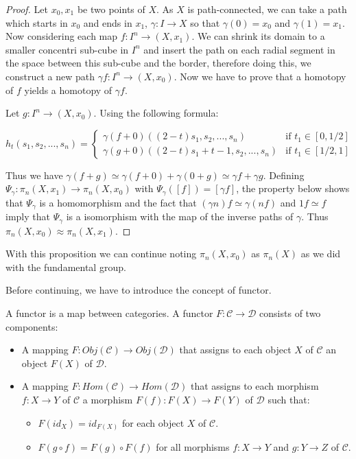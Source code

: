 \documentclass[12pt]{article}
\begin{document}
\begin{proof}
	Let \(x_0, x_1\) be two points of \(X\). As \(X\) is path-connected, we can take a path which starts in \(x_0\) and ends in \(x_1\), \(\gamma : I \rightarrow X\) so that \(\gamma(0) = x_0\) and \(\gamma(1) = x_1\). Now considering each map \(f : I^n \rightarrow (X, x_1)\). We can shrink its domain to a smaller concentri sub-cube in \(I^n\) and insert the path on each radial segment in the space between this sub-cube and the border, therefore doing this, we construct a new path \(\gamma f : I^n \rightarrow (X, x_0)\). Now we have to prove that a homotopy of \(f\) yields a homotopy of \(\gamma f\).

	Let \(g : I^n \rightarrow (X, x_0)\). Using the following formula:

	\[
		h_t(s_1, s_2, ..., s_n) = \begin{cases}
			\gamma (f+0) ((2-t)s_1, s_2, ..., s_n) & \text{if } t_1 \in [0, 1/2] \\
			\gamma (g+0) ((2-t)s_1 + t - 1, s_2, ..., s_n) & \text{if } t_1 \in [1/2, 1]
		\end{cases}
	\]

	Thus we have \(\gamma (f+g) \simeq \gamma (f+0) + \gamma (0+g) \simeq \gamma f + \gamma g\). Defining \(\Psi_\gamma : \pi_n(X,x_1) \rightarrow \pi_n(X, x_0)\) with \(\Psi_\gamma([f]) = [\gamma f]\), the property below shows that \(\Psi_\gamma\) is a homomorphism and the fact that \((\gamma n)f \simeq \gamma (nf)\) and \(1f \simeq f\) imply that \(\Psi_\gamma\) is a isomorphism with the map of the inverse paths of \(\gamma\). Thus \(\pi_n(X, x_0) \approx \pi_n(X, x_1)\).
\end{proof}

With this proposition we can continue noting \(\pi_n(X, x_0)\) as \(\pi_n(X)\) as we did with the fundamental group.

Before continuing, we have to introduce the concept of functor. 

\begin{definition}[Functor]
	A functor is a map between categories. A functor \(F : \mathcal{C} \rightarrow \mathcal{D}\) consists of two components:
	\begin{itemize}
		\item A mapping \(F : Obj(\mathcal{C}) \rightarrow Obj(\mathcal{D})\) that assigns to each object \(X\) of \(\mathcal{C}\) an object \(F(X)\) of \(\mathcal{D}\).
		\item A mapping \(F : Hom(\mathcal{C}) \rightarrow Hom(\mathcal{D})\) that assigns to each morphism \(f : X \rightarrow Y\) of \(\mathcal{C}\) a morphism \(F(f) : F(X) \rightarrow F(Y)\) of \(\mathcal{D}\) such that:
		\begin{itemize}
			\item \(F(id_X) = id_{F(X)}\) for each object \(X\) of \(\mathcal{C}\).
			\item \(F(g \circ f) = F(g) \circ F(f)\) for all morphisms \(f : X \rightarrow Y\) and \(g : Y \rightarrow Z\) of \(\mathcal{C}\).
		\end{itemize}
	\end{itemize}
\end{definition}
\end{document}
